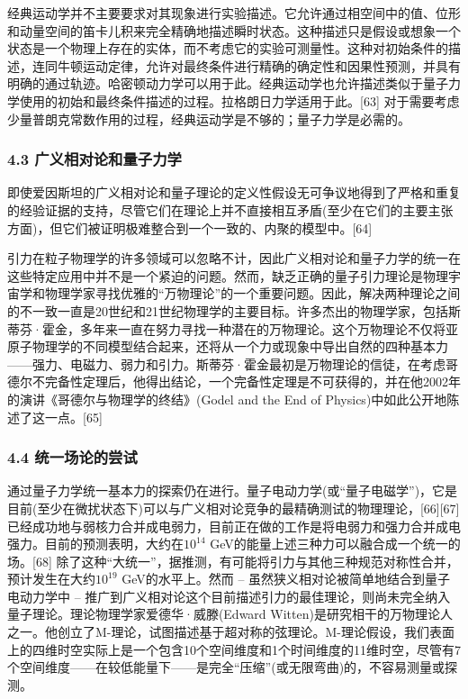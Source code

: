 经典运动学并不主要要求对其现象进行实验描述。它允许通过相空间中的值、位形和动量空间的笛卡儿积来完全精确地描述瞬时状态。这种描述只是假设或想象一个状态是一个物理上存在的实体，而不考虑它的实验可测量性。这种对初始条件的描述，连同牛顿运动定律，允许对最终条件进行精确的确定性和因果性预测，并具有明确的通过轨迹。哈密顿动力学可以用于此。经典运动学也允许描述类似于量子力学使用的初始和最终条件描述的过程。拉格朗日力学适用于此。[63] 对于需要考虑少量普朗克常数作用的过程，经典运动学是不够的；量子力学是必需的。

\subsubsection{4.3 广义相对论和量子力学}
即使爱因斯坦的广义相对论和量子理论的定义性假设无可争议地得到了严格和重复的经验证据的支持，尽管它们在理论上并不直接相互矛盾(至少在它们的主要主张方面)，但它们被证明极难整合到一个一致的、内聚的模型中。[64]

引力在粒子物理学的许多领域可以忽略不计，因此广义相对论和量子力学的统一在这些特定应用中并不是一个紧迫的问题。然而，缺乏正确的量子引力理论是物理宇宙学和物理学家寻找优雅的“万物理论”的一个重要问题。因此，解决两种理论之间的不一致一直是20世纪和21世纪物理学的主要目标。许多杰出的物理学家，包括斯蒂芬·霍金，多年来一直在努力寻找一种潜在的万物理论。这个万物理论不仅将亚原子物理学的不同模型结合起来，还将从一个力或现象中导出自然的四种基本力——强力、电磁力、弱力和引力。斯蒂芬·霍金最初是万物理论的信徒，在考虑哥德尔不完备性定理后，他得出结论，一个完备性定理是不可获得的，并在他2002年的演讲《哥德尔与物理学的终结》(Godel and the End of Physics)中如此公开地陈述了这一点。[65]

\subsubsection{4.4 统一场论的尝试}
通过量子力学统一基本力的探索仍在进行。量子电动力学(或“量子电磁学”)，它是目前(至少在微扰状态下)可以与广义相对论竞争的最精确测试的物理理论，[66][67] 已经成功地与弱核力合并成电弱力，目前正在做的工作是将电弱力和强力合并成电强力。目前的预测表明，大约在$10^{14}$ GeV的能量上述三种力可以融合成一个统一的场。[68] 除了这种“大统一”，据推测，有可能将引力与其他三种规范对称性合并，预计发生在大约$10^{19}$ GeV的水平上。然而  – 虽然狭义相对论被简单地结合到量子电动力学中  – 推广到广义相对论这个目前描述引力的最佳理论，则尚未完全纳入量子理论。理论物理学家爱德华·威滕(Edward Witten)是研究相干的万物理论人之一。他创立了M-理论，试图描述基于超对称的弦理论。M-理论假设，我们表面上的四维时空实际上是一个包含10个空间维度和1个时间维度的11维时空，尽管有7个空间维度——在较低能量下——是完全“压缩”(或无限弯曲)的，不容易测量或探测。


